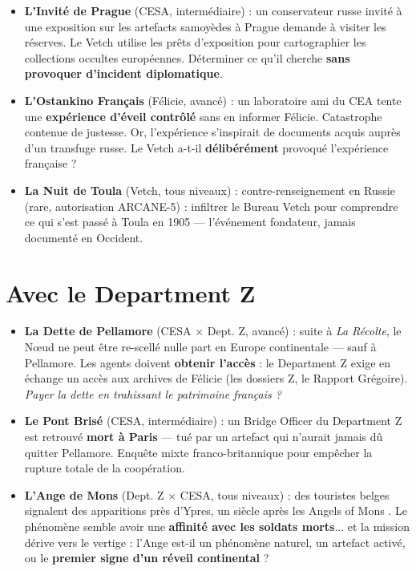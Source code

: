 \documentclass[10pt,a5paper,twoside]{book}
\begin{document}
\begin{itemize}
\item \textbf{L'Invité de Prague} (CESA, intermédiaire) : un \og conservateur russe \fg{} invité à une exposition sur les artefacts samoyèdes à Prague demande à visiter les réserves. Le Vetch utilise les prêts d'exposition pour cartographier les collections occultes européennes. Déterminer ce qu'il cherche \textbf{sans provoquer d'incident diplomatique}.
\item \textbf{L'Ostankino Français} (Félicie, avancé) : un laboratoire \og ami \fg{} du CEA tente une \textbf{expérience d'éveil contrôlé} sans en informer Félicie. Catastrophe contenue de justesse. Or, l'expérience s'inspirait de documents acquis auprès d'un transfuge russe. Le Vetch a-t-il \textbf{délibérément} provoqué l'expérience française ?
\item \textbf{La Nuit de Toula} (Vetch, tous niveaux) : contre-renseignement en Russie (rare, autorisation ARCANE-5) : infiltrer le Bureau Vetch pour comprendre ce qui s'est passé à Toula en 1905 --- l'événement fondateur, jamais documenté en Occident.
\end{itemize}

\section*{Avec le Department Z}

\begin{itemize}
\item \textbf{La Dette de Pellamore} (CESA $\times$ Dept. Z, avancé) : suite à \textit{La Récolte}, le Nœud ne peut être re-scellé nulle part en Europe continentale --- sauf à Pellamore. Les agents doivent \textbf{obtenir l'accès} : le Department Z exige en échange un accès aux archives de Félicie (les dossiers Z, le Rapport Grégoire). \emph{Payer la dette en trahissant le patrimoine français ?}
\item \textbf{Le Pont Brisé} (CESA, intermédiaire) : un Bridge Officer du Department Z est retrouvé \textbf{mort à Paris} --- tué par un artefact qui n'aurait jamais dû quitter Pellamore. Enquête mixte franco-britannique pour empêcher la rupture totale de la coopération.
\item \textbf{L'Ange de Mons} (Dept. Z $\times$ CESA, tous niveaux) : des touristes belges signalent des apparitions près d'Ypres, un siècle après les \og Angels of Mons \fg{}. Le phénomène semble avoir une \textbf{affinité avec les soldats morts}... et la mission dérive vers le vertige : l'Ange est-il un phénomène naturel, un artefact activé, ou le \textbf{premier signe d'un réveil continental} ?
\end{itemize}
\end{document}
